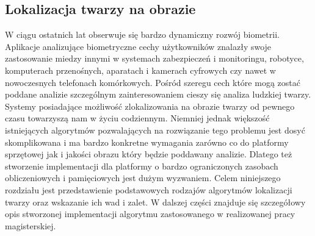 \subsection{Lokalizacja twarzy na obrazie}
W ciągu ostatnich lat obserwuje się bardzo dynamiczny rozwój biometrii.
Aplikacje analizujące biometryczne cechy użytkowników znalazły swoje
zastosowanie miedzy innymi w systemach zabezpieczeń i monitoringu, robotyce,
komputerach przenośnych, aparatach i kamerach cyfrowych czy nawet w nowoczesnych
telefonach komórkowych. Pośród szeregu cech które mogą zostać poddane analizie
szczególnym zainteresowaniem cieszy się analiza ludzkiej twarzy. Systemy
posiadające możliwość zlokalizowania na obrazie twarzy od pewnego czasu
towarzyszą nam w życiu codziennym. Niemniej jednak większość istniejących
algorytmów pozwalających na rozwiązanie tego problemu jest
dosyć skomplikowana i ma bardzo konkretne wymagania zarówno co do platformy sprzętowej
jak i jakości obrazu który będzie poddawany analizie. Dlatego też stworzenie
implementacji dla platformy o bardzo ograniczonych zasobach obliczeniowych i
pamięciowych jest dużym wyzwaniem. Celem niniejszego rozdziału jest
przedstawienie podstawowych rodzajów algorytmów lokalizacji twarzy oraz
wskazanie ich wad i zalet. W dalszej części znajduje się szczegółowy opis
stworzonej implementacji algorytmu zastosowanego w realizowanej pracy magisterskiej.

